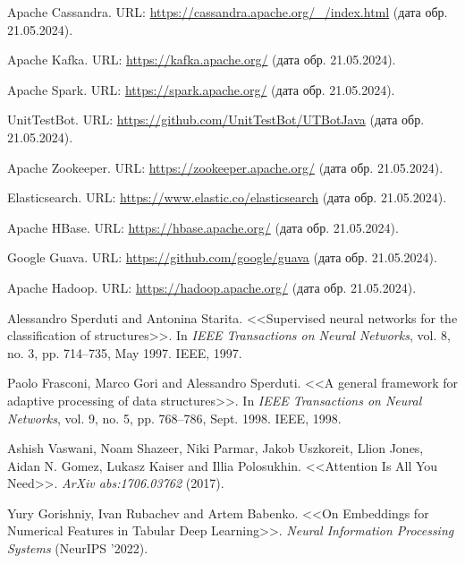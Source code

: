 \begin{thebibliography}{1}
 Apache Cassandra. URL: \url{https://cassandra.apache.org/_/index.html} (дата обр. 21.05.2024).

 Apache Kafka. URL: \url{https://kafka.apache.org/} (дата обр. 21.05.2024).

 Apache Spark. URL: \url{https://spark.apache.org/} (дата обр. 21.05.2024).

 UnitTestBot. URL: \url{https://github.com/UnitTestBot/UTBotJava} (дата обр. 21.05.2024).

 Apache Zookeeper. URL: \url{https://zookeeper.apache.org/} (дата обр. 21.05.2024).

 Elasticsearch. URL: \url{https://www.elastic.co/elasticsearch} (дата обр. 21.05.2024).

 Apache HBase. URL: \url{https://hbase.apache.org/} (дата обр. 21.05.2024).

 Google Guava. URL: \url{https://github.com/google/guava} (дата обр. 21.05.2024).

 Apache Hadoop. URL: \url{https://hadoop.apache.org/} (дата обр. 21.05.2024).

 Alessandro Sperduti and Antonina Starita. <<Supervised neural networks for the classification of structures>>. In \textit{IEEE Transactions on Neural Networks}, vol. 8, no. 3, pp. 714--735, May 1997. IEEE, 1997.

 Paolo Frasconi, Marco Gori and Alessandro Sperduti. <<A general framework for adaptive processing of data structures>>. In \textit{IEEE Transactions on Neural Networks}, vol. 9, no. 5, pp. 768--786, Sept. 1998. IEEE, 1998.

 Ashish Vaswani, Noam Shazeer, Niki Parmar, Jakob Uszkoreit, Llion Jones, Aidan N. Gomez, Lukasz Kaiser and Illia Polosukhin. <<Attention Is All You Need>>. \textit{ArXiv abs:1706.03762} (2017).


 Yury Gorishniy, Ivan Rubachev and Artem Babenko. <<On Embeddings for Numerical Features in Tabular Deep Learning>>. \textit{Neural Information Processing Systems} (NeurIPS '2022).


\end{thebibliography}
